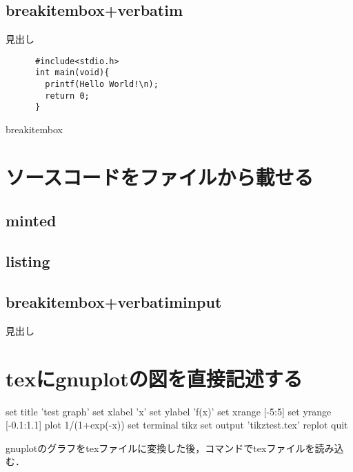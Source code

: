 \documentclass[a4j,titlepage,dvipdfmx,uplatex]{jsarticle}   %
\begin{document}
  \subsection{breakitembox+verbatim}

  \begin{breakitembox}[l]{見出し}
    \begin{verbatim}
      #include<stdio.h>
      int main(void){
        printf(Hello World!\n);
        return 0;
      }
    \end{verbatim}
  \end{breakitembox}
  \begin{breakitembox}[l]{breakitembox}
    
  \end{breakitembox}

\section{ソースコードをファイルから載せる}
\subsection{minted}

\subsection{listing}


\subsection{breakitembox+verbatiminput}
\begin{breakitembox}[l]{見出し}
   
\end{breakitembox}

\section{texにgnuplotの図を直接記述する}
\begin{shellcode}
  set title 'test graph'
  set xlabel 'x'
  set ylabel 'f(x)'
  set xrange [-5:5]
  set yrange [-0.1:1.1]
  plot 1/(1+exp(-x))
  set terminal tikz
  set output 'tikztest.tex'
  replot
  quit
\end{shellcode}
gnuplotのグラフをtexファイルに変換した後，\verb||コマンドでtexファイルを読み込む．
\end{document}
